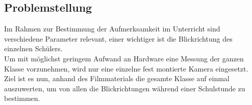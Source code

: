 \subsection{Problemstellung}
Im Rahmen zur Bestimmung der Aufmerksamkeit im Unterricht sind verschiedene Parameter relevant, einer wichtiger ist die Blickrichtung des einzelnen Schülers.\\
Um mit möglichst geringem Aufwand an Hardware eine Messung der ganzen Klasse vorzunehmen, wird nur eine einzelne fest montierte Kamera eingesetzt.\\
Ziel ist es nun, anhand des Filmmaterials die gesamte Klasse auf einmal auszuwerten, um von allen die Blickrichtungen während einer Schulstunde zu bestimmen.